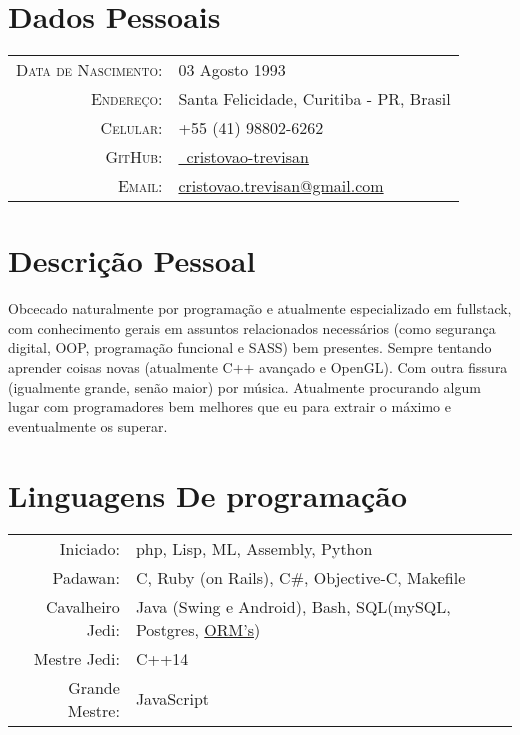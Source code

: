 



\pagestyle{empty} %

\par{\bigskip\par}

\section{Dados Pessoais}
\begin{tabular}{rl}
	\textsc{Data de Nascimento:} & 03 Agosto 1993 \\
	\textsc{Endereço:}	& Santa Felicidade, Curitiba - PR, Brasil \\
	\textsc{Celular:}	& +55 (41) 98802-6262\\
	\textsc{GitHub:}	& \href{https://github.com/cristovao-trevisan}{\faGithub\ cristovao-trevisan} \\
	\textsc{Email:}	& \href{mailto:cristovao.trevisan@gmail.com}{cristovao.trevisan@gmail.com} \\
\end{tabular}

\section{Descrição Pessoal}

Obcecado naturalmente por programação e atualmente especializado em fullstack,
com conhecimento gerais em assuntos relacionados necessários (como segurança digital,
OOP, programação funcional e SASS) bem presentes. Sempre tentando aprender coisas
novas (atualmente C++ avançado e OpenGL). Com outra fissura (igualmente grande, senão
maior) por música. Atualmente procurando algum lugar com programadores bem melhores
que eu para extrair o máximo e eventualmente os superar.

\section{Linguagens De programação}
\begin{tabular}{rl}
	Iniciado:& php, Lisp, ML, Assembly, Python\\
	Padawan:& C, Ruby (on Rails), C\#, Objective-C, Makefile\\
	Cavalheiro Jedi:& Java (Swing e Android), Bash, SQL(mySQL, Postgres, \underline{ORM's})\\
	Mestre Jedi:& C++14\\
	Grande Mestre:& JavaScript
\end{tabular}


